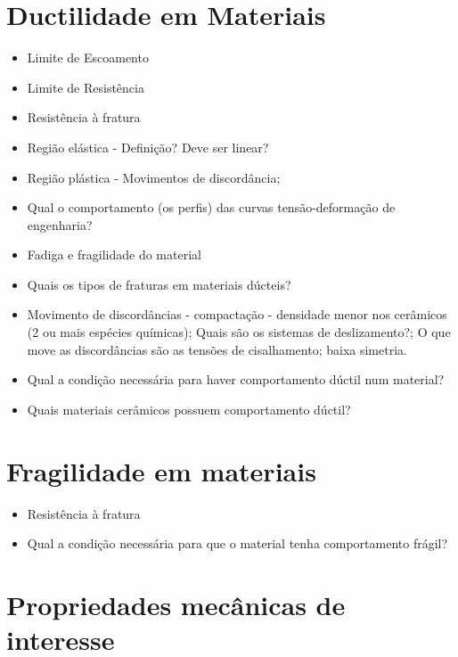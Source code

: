 
\begin{multicols*}{2}

\section*{Ductilidade em Materiais}

  \begin{itemize}
    \item Limite de Escoamento
    \item Limite de Resistência
    \item Resistência à fratura
    \item Região elástica - Definição? Deve ser linear? 
    \item Região plástica - Movimentos de discordância;
    \item Qual o comportamento (os perfis) das curvas tensão-deformação de engenharia?
    \item Fadiga e fragilidade do material
    \item Quais os tipos de fraturas em materiais dúcteis?
    \item Movimento de discordâncias - compactação - densidade menor nos cerâmicos (2 ou mais espécies químicas); Quais são os sistemas de deslizamento?; O que move as discordâncias são as tensões de cisalhamento; baixa simetria.
    \item Qual a condição necessária para haver comportamento dúctil num material?
    \item Quais materiais cerâmicos possuem comportamento dúctil?
  \end{itemize}

\section*{Fragilidade em materiais}

  \begin{itemize}
    \item Resistência à fratura
    \item Qual a condição necessária para que o material tenha comportamento frágil?
  \end{itemize}

\section*{Propriedades mecânicas de interesse}


\end{multicols*}

